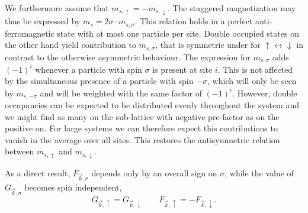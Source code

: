 \documentclass[a4paper,12pt]{report}
\begin{document}
We furthermore assume that $m_{s,\uparrow}=-m_{s,\downarrow}$. 
The staggered magnetization may thus be expressed by $m_s=2\sigma \cdot m_{s,\sigma}$.
This relation holds in a perfect anti-ferromagnetic state with at most one particle per site. 
Double occupied states on the other hand yield  contribution to $m_{s,\sigma}$, that is symmetric under for $\uparrow \leftrightarrow \downarrow$ in contrast to the 
otherwise asymmetric behaviour.
The expression for $m_{s,\sigma}$ adds $(-1)^i$  whenever a particle with spin $\sigma$ is present at site $i$. 
This is not affected by the simultaneous presence of a particle with spin $-\sigma$, 
which will only be seen by $m_{s,-\sigma}$ and will be weighted with the same factor of $(-1)^i$.
However, double occupancies can be expected to be distributed evenly throughout the system
and we might find as many on the sub-lattice with negative pre-factor as on the positive on.
For large systems we can therefore expect this contributions to vanish in the average over all sites.
This restores the antisymmetric relation between $m_{s,\uparrow}$ and $m_{s,\downarrow}$. 

As a direct result, $F_{\vec k,\sigma}$ depends only by an overall sign on $\sigma$, while the value of $G_{\vec k,\sigma}$ becomes spin independent,
\begin{equation}
 G_{\vec k,\uparrow} = G_{\vec k,\downarrow} \qquad F_{\vec k,\uparrow} =-F_{\vec k,\downarrow}.
\end{equation}
\end{document}

